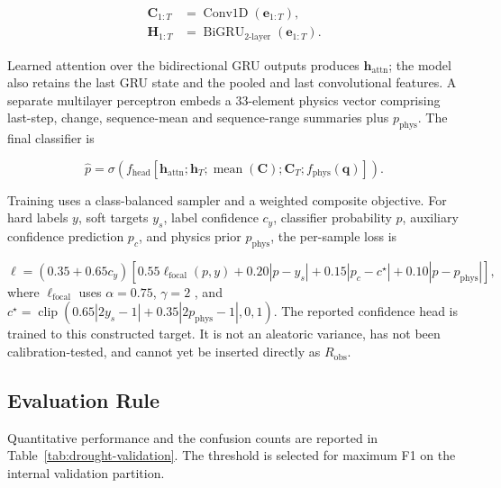 \documentclass[11pt,a4paper]{article}
\newcommand{\vect}[1]{\bm{#1}}
\begin{document}
\begin{equation}
\begin{aligned}
\vect C_{1:T}
&=\operatorname{Conv1D}(\vect e_{1:T}),\\
\vect H_{1:T}
&=\operatorname{BiGRU}_{2\text{-layer}}(\vect e_{1:T}).
\end{aligned}
\end{equation}

Learned attention over the bidirectional GRU outputs produces
$\vect h_{\mathrm{attn}}$; the model also retains the last GRU state and
the pooled and last convolutional features. A separate multilayer
perceptron embeds a 33-element physics vector comprising last-step,
change, sequence-mean and sequence-range summaries plus $p_{\mathrm{phys}}$.
The final classifier is

\begin{equation}
\hat p=\sigma\left(
f_{\mathrm{head}}[
\vect h_{\mathrm{attn}};
\vect h_T;
\operatorname{mean}(\vect C);
\vect C_T;
f_{\mathrm{phys}}(\vect q)]
\right).
\end{equation}

Training uses a class-balanced sampler and a weighted composite
objective. For hard labels $y$, soft targets $y_s$, label confidence
$c_y$, classifier probability $p$, auxiliary confidence prediction
$p_c$, and physics prior $p_{\mathrm{phys}}$, the per-sample loss is

\begin{equation}
\ell
=
(0.35+0.65c_y)
\left[
0.55\ell_{\mathrm{focal}}(p,y)
 + 0.20|p-y_s|
 + 0.15|p_c-c^\star|
 + 0.10|p-p_{\mathrm{phys}}|
\right],
\end{equation}
where $\ell_{\mathrm{focal}}$ uses $\alpha=0.75$, $\gamma=2$
\cite{lin2017}, and
$c^\star=\operatorname{clip}(0.65|2y_s-1|+
0.35|2p_{\mathrm{phys}}-1|,0,1)$. The reported confidence head is
trained to this constructed target. It is not an aleatoric variance,
has not been calibration-tested, and cannot yet be inserted directly
as $R_{\mathrm{obs}}$.

\subsection{Evaluation Rule}

Quantitative performance and the confusion counts are reported in
Table~\ref{tab:drought-validation}. The threshold is selected for
maximum F1 on the internal validation partition.

\end{document}
